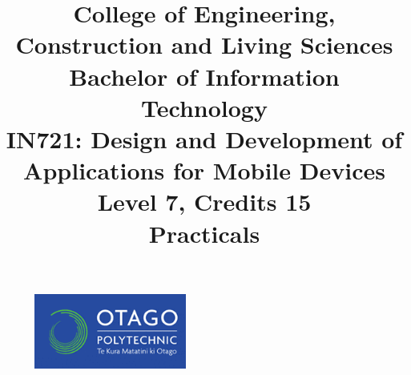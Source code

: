 \documentclass{article}
\author{}
\begin{document}
\begin{figure}
	\centering
	\includegraphics[width=50mm]{../resources/img/logo.png}
\end{figure}

\title{College of Engineering, Construction and Living Sciences\\Bachelor of Information Technology\\IN721: Design and Development of Applications for Mobile Devices\\Level 7, Credits 15\\\textbf{Practicals}}
\date{}
\maketitle
\end{document}
